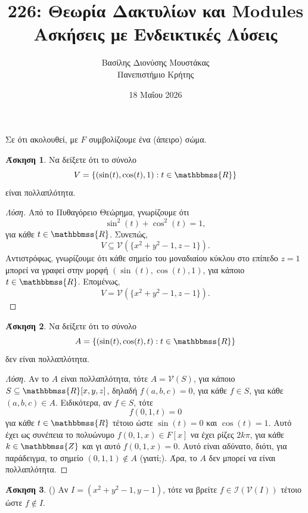 \documentclass[12pt,a4paper,reqno]{amsart}
\title{226: Θεωρία Δακτυλίων και Modules \\ Ασκήσεις με Ενδεικτικές Λύσεις}
\author[Β.~Δ. Μουστακας]{Βασίλης Διονύσης Μουστάκας \\ Πανεπιστήμιο Κρήτης}
\date{18 Μαΐου 2026}
\theoremstyle{definition}
\newtheorem{exercise}{Άσκηση}
\newcommand{\ZZ}{\mathbbmss{Z}}
\newcommand{\RR}{\mathbbmss{R}}
\newcommand{\iI}{\mathcal{I}}
\newcommand{\vV}{\mathcal{V}}
\begin{document}
\begingroup
\def\uppercasenonmath#1{} %
\let\MakeUppercase\relax %
\maketitle
\endgroup

\setcounter{exercise}{42}
\setcounter{equation}{10}
\renewcommand{\thesubsection}{\thesection.\arabic{subsection}}

Σε ότι ακολουθεί, με $F$ συμβολίζουμε ένα (άπειρο) σώμα.

\begin{exercise}
  Να δείξετε ότι το σύνολο \[V = \{(\sin(t), \cos(t), 1) : t \in \RR\}\] είναι πολλαπλότητα.
\end{exercise}

\begin{proof}[Λύση]
  Από το Πυθαγόρειο Θεώρημα, γνωρίζουμε ότι 
  \[
  \sin^2(t) + \cos^2(t) = 1,
  \]
  για κάθε $t \in \RR$. Συνεπώς,
  \[
  V \subseteq \vV\left(
    \{x^2 + y^2 -1, z-1\}
  \right).
  \]
  Αντιστρόφως, γνωρίζουμε ότι κάθε σημείο του μοναδιαίου κύκλου στο επίπεδο $z=1$ μπορεί να γραφεί στην μορφή $(\sin(t), \cos(t), 1)$, για κάποιο $t \in \RR$. Επομένως, 
  \[
  V = \vV\left(
    \{x^2 + y^2 -1, z-1\}
  \right).
  \]
\end{proof}

\begin{exercise}
  \label{ex:nonexample_variety}
  Να δείξετε ότι το σύνολο \[A = \{(\sin(t), \cos(t), t) : t \in \RR\}\] δεν είναι πολλαπλότητα.
\end{exercise}

\begin{proof}[Λύση]
  Αν το $A$ είναι πολλαπλότητα, τότε $A = \vV(S)$, για κάποιο $S \subseteq \RR[x,y,z]$, δηλαδή $f(a, b, c) = 0$, για κάθε $f \in S$, για κάθε $(a, b, c) \in A$. Ειδικότερα, αν $f \in S$, τότε 
  \[
  f(0, 1, t) = 0
  \]
  για κάθε $t \in \RR$ τέτοιο ώστε $\sin(t) = 0$ και $\cos(t) = 1$. Αυτό έχει ως συνέπεια το πολυώνυμο $f(0, 1, x) \in F[x]$ να έχει ρίζες $2k\pi$, για κάθε $k \in \ZZ$ και γι αυτό $f(0,1,x) = 0$. Αυτό είναι αδύνατο, διότι, για παράδειγμα, το σημείο $(0,1,1) \notin A$ (γιατί;). Άρα, το $A$ δεν μπορεί να είναι πολλαπλότητα.
\end{proof}

\begin{exercise}{\rm(\cite[Άσκηση~8.3]{Mal08})}
  \label{ex:mal_8.3}
  Αν $I = (x^2 + y^2-1, y-1)$, τότε να βρείτε $f \in \iI(\vV(I))$ τέτοιο ώστε $f \notin I$.
\end{exercise}
\end{document}

